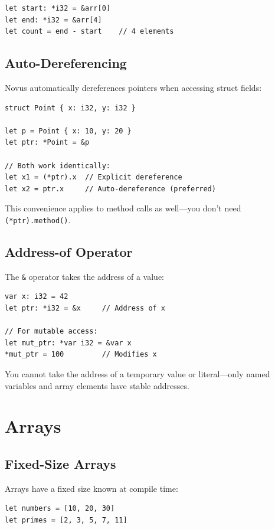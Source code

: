 \begin{lstlisting}
let start: *i32 = &arr[0]
let end: *i32 = &arr[4]
let count = end - start    // 4 elements
\end{lstlisting}

\subsection{Auto-Dereferencing}

Novus automatically dereferences pointers when accessing struct fields:

\begin{lstlisting}
struct Point { x: i32, y: i32 }

let p = Point { x: 10, y: 20 }
let ptr: *Point = &p

// Both work identically:
let x1 = (*ptr).x  // Explicit dereference
let x2 = ptr.x     // Auto-dereference (preferred)
\end{lstlisting}

This convenience applies to method calls as well---you don't need \texttt{(*ptr).method()}.

\subsection{Address-of Operator}

The \texttt{\&} operator takes the address of a value:

\begin{lstlisting}
var x: i32 = 42
let ptr: *i32 = &x     // Address of x

// For mutable access:
let mut_ptr: *var i32 = &var x
*mut_ptr = 100         // Modifies x
\end{lstlisting}

You cannot take the address of a temporary value or literal---only named variables and array elements have stable addresses.

\section{Arrays}

\subsection{Fixed-Size Arrays}

Arrays have a fixed size known at compile time:

\begin{lstlisting}
let numbers = [10, 20, 30]
let primes = [2, 3, 5, 7, 11]
\end{lstlisting}

